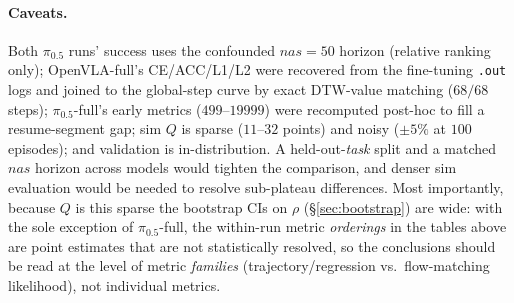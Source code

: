 \documentclass[11pt]{article}
\begin{document}
\paragraph{Caveats.} Both $\pi_{0.5}$ runs' success uses the confounded $nas{=}50$ horizon (relative
ranking only); OpenVLA-full's CE/ACC/L1/L2 were recovered from the fine-tuning \texttt{.out} logs and
joined to the global-step curve by exact DTW-value matching ($68/68$ steps); $\pi_{0.5}$-full's early
metrics ($499$--$19999$) were recomputed post-hoc to fill a resume-segment gap; sim $Q$ is sparse
($11$--$32$ points) and noisy ($\pm5\%$ at $100$ episodes); and validation is in-distribution. A
held-out-\emph{task} split and a matched $nas$ horizon across models would tighten the comparison, and
denser sim evaluation would be needed to resolve sub-plateau differences. Most importantly, because $Q$
is this sparse the bootstrap CIs on $\rho$ (\S\ref{sec:bootstrap}) are wide: with the sole exception of
$\pi_{0.5}$-full, the within-run metric \emph{orderings} in the tables above are point estimates that are
not statistically resolved, so the conclusions should be read at the level of metric \emph{families}
(trajectory/regression vs.\ flow-matching likelihood), not individual metrics.
\end{document}

